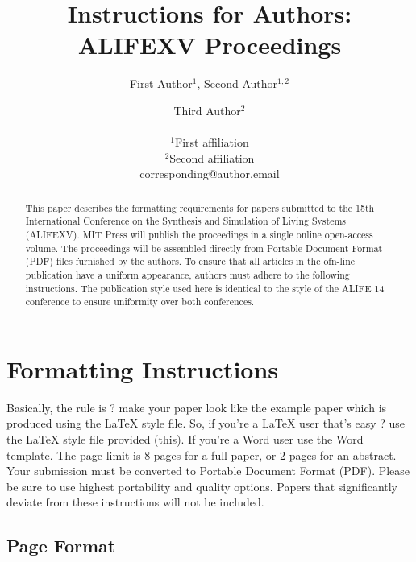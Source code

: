 \documentclass[letterpaper]{article}
\title{Instructions for Authors: ALIFEXV Proceedings}
\author{First Author$^{1}$, Second Author$^{1,2}$ \and Third Author$^2$ \\
\mbox{}\\
$^1$First affiliation  \\
$^2$Second affiliation \\
corresponding@author.email}
\begin{document}
\maketitle

\begin{abstract}
This paper describes the formatting requirements for papers submitted to the 15th International Conference on the Synthesis and Simulation of Living Systems (ALIFEXV). MIT Press will publish the proceedings in a single online open-access volume.  The proceedings will be assembled directly from Portable Document Format (PDF) files furnished by the authors. To ensure that all articles in the ofn-line publication have a uniform appearance, authors must adhere to the following instructions. The publication style used here is identical to the style of the ALIFE 14 conference to ensure uniformity over both conferences.
\end{abstract}

\section{Formatting Instructions}

Basically, the rule is ? make your paper look like the example paper which is 
produced using the LaTeX style file. So, if you're a LaTeX user that's easy ? 
use the LaTeX style file provided (this). If you're a Word user use the  
Word template. 
The page limit is 8 pages for a full paper, or 2 pages for an abstract. 
Your submission must be converted to Portable Document Format (PDF). 
Please be sure to use highest portability and quality options. Papers that 
significantly deviate from these instructions will not be included.


\subsection{Page Format}
\end{document}
